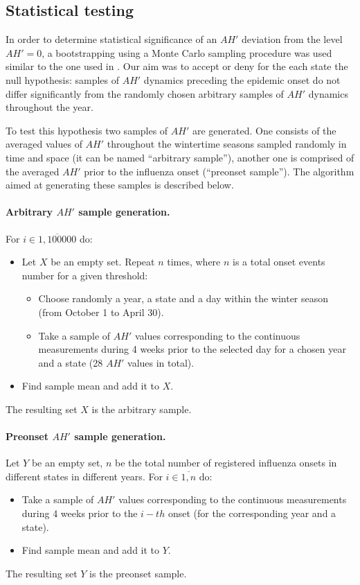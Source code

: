 \documentclass[procedia]{easychair}
\begin{document}
\subsection{Statistical testing}
\label{sect:stats}
In order to determine statistical significance of an $AH'$ deviation from the level $AH' = 0$, a bootstrapping using a Monte Carlo sampling procedure was used similar to the one used in \cite{shaman2010absolute}. Our aim was to accept or deny for the each state the null hypothesis: samples of $AH'$ dynamics preceding the epidemic onset do not differ significantly from the randomly chosen arbitrary samples of $AH'$ dynamics throughout the year. 

To test this hypothesis two samples of $AH'$ are generated. One consists of the averaged values of $AH'$ throughout the wintertime seasons sampled randomly in time and space (it can be named ``arbitrary sample''), another one is comprised of the averaged $AH'$ prior to the influenza onset (``preonset sample''). The algorithm aimed at generating these samples is described below.

\paragraph{Arbitrary $AH'$ sample generation.}
For $i \in \overline{1,100000}$ do:
\begin{itemize}
	\item Let $X$ be an empty set. 
		Repeat $n$ times, where $n$ is a total onset events number for a given threshold:
	\begin{itemize}
		\item Choose randomly a year, a state and a day within the winter season (from October 1 to April 30).
		\item Take a sample of $AH'$ values corresponding to the continuous measurements during 4 weeks prior to the selected day for a chosen year and a state (28 $AH'$ values in total).
	\end{itemize}
	\item Find sample mean and add it to $X$. 
\end{itemize}
The resulting set $X$ is the arbitrary sample.

\paragraph{Preonset $AH'$ sample generation.}
Let $Y$ be an empty set, $n$ be the total number of registered influenza onsets in different states in different years. For $i \in \overline{1,n}$ do:
\begin{itemize}
	\item Take a sample of $AH'$ values corresponding to the continuous measurements during 4 weeks prior to the $i-th$ onset (for the corresponding year and a state).
	\item Find sample mean and add it to $Y$. 
\end{itemize}
The resulting set $Y$ is the preonset sample.
\end{document}
